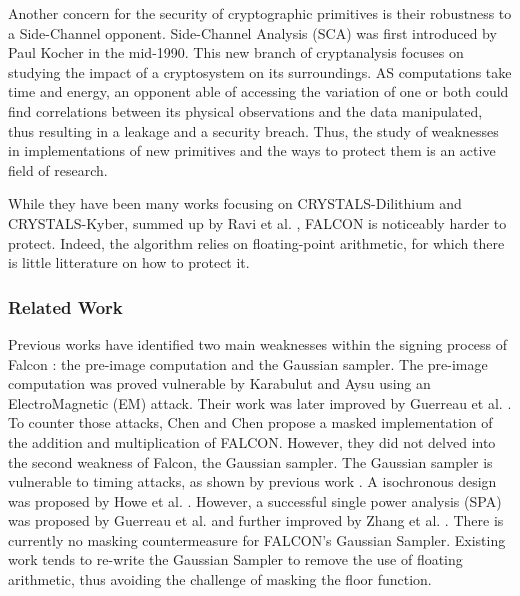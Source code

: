 \documentclass[runningheads]{llncs}
\begin{document}
\medskip

\noindent Another concern for the security of cryptographic primitives is their robustness to a Side-Channel opponent. Side-Channel Analysis (SCA) was first introduced by Paul Kocher \cite{10.1007/3-540-68697-5_9} in the mid-1990. This new branch of cryptanalysis focuses on studying the impact of a cryptosystem on its surroundings. AS computations take time and energy, an opponent able of accessing the variation of one or both could find correlations between its physical observations and the data manipulated, thus resulting in a leakage and a security breach. Thus, the study of weaknesses in implementations of new primitives and the ways to protect them is an active field of research.

\medskip While they have been many works focusing on CRYSTALS-Dilithium and CRYSTALS-Kyber, summed up by Ravi et al. \cite{10.1145/3603170}, FALCON is noticeably harder to protect. Indeed, the algorithm relies on floating-point arithmetic, for which there is little litterature on how to protect it.

\subsubsection{Related Work} Previous works have identified two main weaknesses within the signing process of Falcon : the pre-image computation and the Gaussian sampler. The pre-image computation was proved vulnerable by Karabulut and Aysu \cite{9586131} using an ElectroMagnetic (EM) attack. Their work was later improved by Guerreau et al. \cite{Guerreau_Martinelli_Ricosset_Rossi_2022}. To counter those attacks, Chen and Chen \cite{Chen_Chen_2024} propose a masked implementation of the addition and multiplication of FALCON. However, they did not delved into the second weakness of Falcon, the Gaussian sampler.\newline
The Gaussian sampler is vulnerable to timing attacks, as shown by previous work \cite{10.1007/978-3-662-53140-2_16,10.1145/3133956.3134028,cryptoeprint:2019/478,10.1145/3133956.3134023}. A isochronous design was proposed by Howe et al. \cite{10.1007/978-3-030-44223-1_4}. However, a successful single power analysis (SPA) was proposed by Guerreau et al. \cite{Guerreau_Martinelli_Ricosset_Rossi_2022} and further improved by Zhang et al. \cite{10.1007/978-3-031-30634-1_19}. There is currently no masking countermeasure for FALCON's Gaussian Sampler. Existing work \cite{10.1007/978-3-031-07082-2_9} tends to re-write the Gaussian Sampler to remove the use of floating arithmetic, thus avoiding the challenge of masking the floor function. 
\end{document}
